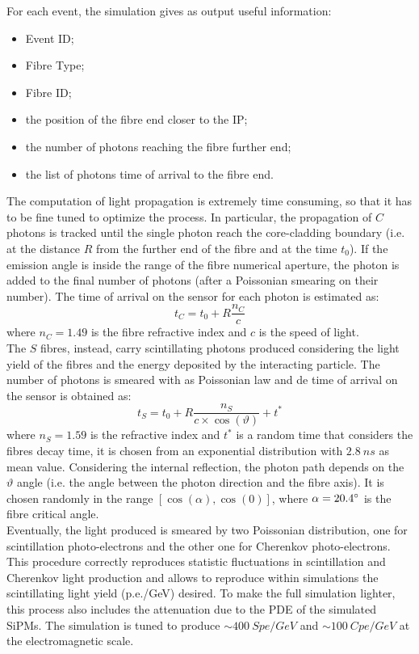 For each event, the simulation gives as output useful information: 
\begin{itemize}
	\item Event ID;
	\item Fibre Type;
	\item Fibre ID;
	\item the position of the fibre end closer to the IP;
	\item the number of photons reaching the fibre further end;
	\item the list of photons time of arrival to the fibre end.
\end{itemize}

The computation of light propagation is extremely time consuming, so that it has to be fine tuned to optimize the process. In particular, the propagation of $C$ photons is tracked until the single photon reach the core-cladding boundary (i.e. at the distance $R$ from the further end of the fibre and at the time $t_0$). If the emission angle is inside the range of the fibre numerical aperture, the photon is added to the final number of photons (after a Poissonian smearing on their number).
The time of arrival on the sensor for each photon is estimated as:
\begin{equation}
t_C = t_0 + R \frac{n_C}{c}
\end{equation}
where $n_C = 1.49$ is the fibre refractive index and $c$ is the speed of light.\\

The $S$ fibres, instead, carry scintillating photons produced considering the light yield of the fibres and the energy deposited by the interacting particle. The number of photons is smeared with as Poissonian law and de time of arrival on the sensor is obtained as:
\begin{equation}
	t_S = t_0 + R\frac{n_S}{c\times \cos(\vartheta)} + t^*
\end{equation}
where $n_S = 1.59$ is the refractive index and $t^*$ is a random time that considers the fibres decay time, it is chosen from an exponential distribution with $2.8\ ns$ as mean value.
Considering the internal reflection, the photon path depends on the $\vartheta$ angle (i.e. the angle between the photon direction and the fibre axis). It is chosen randomly in the range $[\cos(\alpha),\cos(0)]$, where $\alpha = 20.4\degree$ is the fibre critical angle.\\
Eventually, the light produced is smeared by two Poissonian distribution, one for scintillation photo-electrons and the other one for Cherenkov photo-electrons. This procedure correctly reproduces statistic fluctuations in scintillation and Cherenkov light production and allows to reproduce within simulations the scintillating light yield (p.e./GeV) desired. To make the full simulation lighter, this process also includes the attenuation due to the PDE of the simulated SiPMs. The simulation is tuned to produce $\sim 400\ Spe/GeV$ and $\sim 100\ Cpe/GeV$ at the electromagnetic scale.

